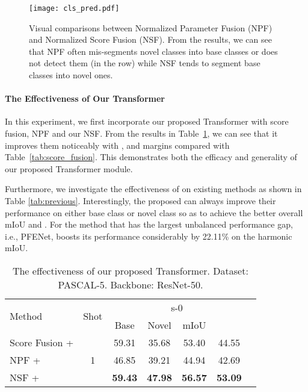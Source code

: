 \documentclass[journal]{IEEEtran}
\begin{document}
\begin{figure}[t]
    \centering
    \texttt{[image: cls\_pred.pdf]}
\caption{Visual comparisons between Normalized Parameter Fusion (NPF) and Normalized Score Fusion (NSF). From the results, we can see that NPF often mis-segments novel classes into base classes or does not detect them (in the  row) while NSF tends to segment base classes into novel ones.}
    \label{fig:joint_cls_pred}
\end{figure}

\paragraph{The Effectiveness of Our Transformer }
In this experiment, we first incorporate our proposed Transformer  with score fusion, NPF and our NSF. From the results in Table~\ref{tab:joint_cls}, we can see that it improves them noticeably with ,  and   margins compared with Table~\ref{tab:score_fusion}. This demonstrates both the efficacy and generality of our proposed Transformer module.

Furthermore, we investigate the effectiveness of  on existing methods as shown in Table \ref{tab:previous}. Interestingly, the proposed  can always improve their performance on either base class or novel class so as to achieve the better overall mIoU and . For the method that has the largest unbalanced performance gap, i.e., PFENet,  boosts its performance considerably by 22.11\% on the harmonic mIoU.

\begin{table}[ht]
    \centering
    \caption{The effectiveness of our proposed Transformer. Dataset: PASCAL-5. Backbone: ResNet-50.}
\begin{tabular}{l|c|ccccc}
    \hline
         \multirow{2}{*}{Method} & \multirow{2}{*}{Shot} & \multicolumn{4}{c}{s-0} \\
         \cline{3-6}
          & & Base & Novel & mIoU &  \\
         \hline
        Score Fusion +  & \multirow{3}{*}{1} & 59.31 & 35.68 & 53.40 & 44.55 \\
         NPF +  & & 46.85 & 39.21 & 44.94 & 42.69 \\
         NSF +  & & \textbf{59.43} & \textbf{47.98} & \textbf{56.57} & \textbf{53.09} \\
    \hline
    \end{tabular}
    \label{tab:joint_cls}
\end{table}
\end{document}
